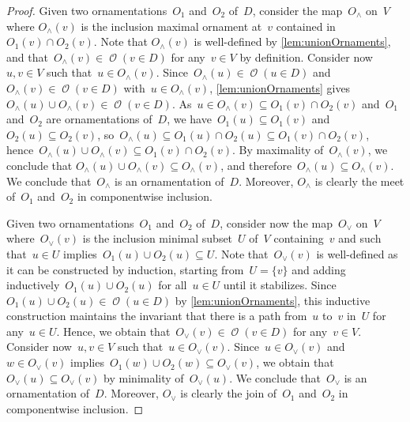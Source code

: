 \documentclass{amsart}
\theoremstyle{definition}
\renewcommand{\c}[1]{\mathcal{#1}} %
\newcommand{\set}[2]{\left\{ #1 \;\middle|\; #2 \right\}} %
\newcommand{\meet}{\wedge} %
\newcommand{\join}{\vee} %
\DeclareMathOperator{\Orn}{\c{O}}  %
\begin{document}
\begin{proof}
%
Given two ornamentations~$O_1$ and~$O_2$ of~$D$, consider the map~$O_\meet$ on~$V$ where $O_\meet(v)$ is the inclusion maximal ornament at~$v$ contained in~$O_1(v) \cap O_2(v)$.
Note that $O_\meet(v)$ is well-defined by \cref{lem:unionOrnaments}, and that~$O_\meet(v) \in \Orn(v \in D)$ for any~$v \in V$ by definition.
Consider now~$u,v \in V$ such that~$u \in O_\meet(v)$.
Since~$O_\meet(u) \in \Orn(u \in D)$ and~$O_\meet(v) \in \Orn(v \in D)$ with~${u \in O_\meet(v)}$, \cref{lem:unionOrnaments} gives~$O_\meet(u) \cup O_\meet(v) \in \Orn(v \in D)$.
As~$u \in O_\meet(v) \subseteq O_1(v) \cap O_2(v)$ and~$O_1$ and~$O_2$ are ornamentations of~$D$, we have~$O_1(u) \subseteq O_1(v)$ and~$O_2(u) \subseteq O_2(v)$, so~${O_\meet(u) \subseteq O_1(u) \cap O_2(u) \subseteq O_1(v) \cap O_2(v)}$, hence~$O_\meet(u) \cup O_\meet(v) \subseteq O_1(v) \cap O_2(v)$.
By maximality of~$O_\meet(v)$, we conclude that ${O_\meet(u) \cup O_\meet(v) \subseteq O_\meet(v)}$, and therefore~$O_\meet(u) \subseteq O_\meet(v)$.
We conclude that~$O_\meet$ is an ornamentation of~$D$.
Moreover, $O_\meet$ is clearly the meet of~$O_1$ and~$O_2$ in componentwise inclusion.

Given two ornamentations~$O_1$ and~$O_2$ of~$D$, consider now the map~$O_\join$ on~$V$ where~$O_\join(v)$ is the inclusion minimal subset~$U$ of~$V$ containing~$v$ and such that~$u \in U$ implies~$O_1(u) \cup O_2(u) \subseteq U$.
Note that~$O_\join(v)$ is well-defined as it can be constructed by induction, starting from~$U = \{v\}$ and adding inductively~$O_1(u) \cup O_2(u)$ for all~$u \in U$ until it stabilizes.
Since~$O_1(u) \cup O_2(u) \in \Orn(u \in D)$ by \cref{lem:unionOrnaments}, this inductive construction maintains the invariant that there is a path from~$u$ to~$v$ in~$U$ for any~$u \in U$.
Hence, we obtain that~$O_\join(v) \in \Orn(v \in D)$ for any~$v \in V$.
Consider now~$u,v \in V$ such that~$u \in O_\join(v)$.
Since~$u \in O_\join(v)$ and~$w \in O_\join(v)$ implies~$O_1(w) \cup O_2(w) \subseteq O_\join(v)$, we obtain that~$O_\join(u) \subseteq O_\join(v)$ by minimality of~$O_\join(u)$.
We conclude that~$O_\join$ is an ornamentation of~$D$.
Moreover, $O_\join$ is clearly the join of~$O_1$ and~$O_2$ in componentwise inclusion.
\end{proof}
\end{document}
